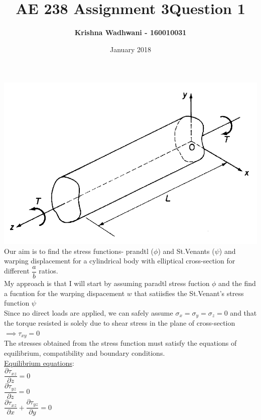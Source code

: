 \documentclass{article}
\title{\Huge \textbf{AE 238 Assignment 3}}
\author{\Huge \textbf{Krishna Wadhwani - 160010031 }}
\date{January 2018}
\begin{document}
\maketitle


\noindent \title{\LARGE \textbf{Question 1}}
\bigbreak
\includegraphics[scale=0.8]{1.png}\\
\noindent Our aim is to find the stress functions- prandtl ($\phi$) and St.Venants ($\psi$) and warping displacement for a cylindrical body with elliptical cross-section for different $\dfrac{a}{b}$ ratios. \\

\noindent My approach is that I will start by assuming paradtl stress fuction $\phi$ and the find a fucntion for the warping dispacement $w$ that satiisfies the St.Venant's stress function $\psi$\\

\noindent Since no direct loads are applied, we can safely assume $\sigma_{x}=\sigma_{y}=\sigma_{z}=0$ and that the torque resisted is solely due to shear stress in the plane of cross-section $\implies \tau_{xy}=0$\\

\noindent The stresses obtained from the stress function must satisfy the equations of equilibrium, compatibility and boundary conditions.  \\

\noindent \underline{Equilibrium equations}: \\

\noindent $\dfrac{\partial \tau_{xz}}{\partial z}=0$\\
$\dfrac{\partial \tau_{yz}}{\partial z}=0$\\
$\dfrac{\partial \tau_{xz}}{\partial x} + \dfrac{\partial \tau_{yz}}{\partial y}=0$\\
\end{document}
